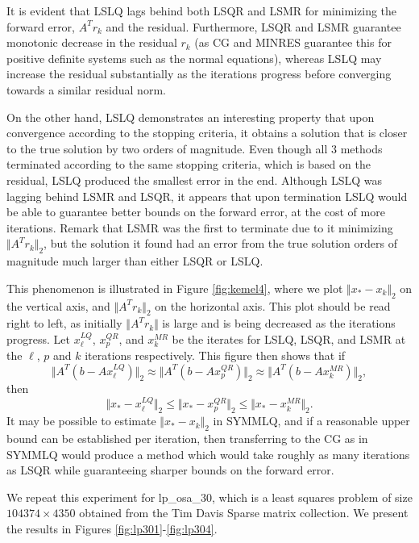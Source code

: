 \documentclass[11pt]{article}
\begin{document}
It is evident that LSLQ lags behind both LSQR and LSMR for minimizing the forward error, $A^T r_k$ and the residual. Furthermore, LSQR and LSMR guarantee monotonic decrease in the residual $r_k$ (as CG and MINRES guarantee this for positive definite systems such as the normal equations), whereas LSLQ may increase the residual substantially as the iterations progress before converging towards a similar residual norm.

On the other hand, LSLQ demonstrates an interesting property that upon convergence according to the stopping criteria, it obtains a solution that is closer to the true solution by two orders of magnitude. Even though all 3 methods terminated according to the same stopping criteria, which is based on the residual, LSLQ produced the smallest error in the end. Although LSLQ was lagging behind LSMR and LSQR, it appears that upon termination LSLQ would be able to guarantee better bounds on the forward error, at the cost of more iterations. Remark that LSMR was the first to terminate due to it minimizing $\Vert A^T r_k \Vert_2$, but the solution it found had an error from the true solution orders of magnitude much larger than either LSQR or LSLQ.

This phenomenon is illustrated in Figure \ref{fig:kemel4}, where we plot $\Vert x_* - x_k \Vert_2$ on the vertical axis, and $\Vert A^T r_k \Vert_2$ on the horizontal axis. This plot should be read right to left, as initially $\Vert A^T r_k \Vert$ is large and is being decreased as the iterations progress. Let $x^{LQ}_\ell$, $x^{QR}_p$, and $x^{MR}_k$ be the iterates for LSLQ, LSQR, and LSMR at the $\ell$, $p$ and $k$ iterations respectively. This figure then shows that if
$$ \Vert A^T (b - A x^{LQ}_\ell) \Vert_2 \approx \Vert A^T (b - A x^{QR}_p) \Vert_2 \approx \Vert A^T (b - A x^{MR}_k) \Vert_2,$$
then
$$ \Vert x_* - x^{LQ}_\ell \Vert_2 \leq \Vert x_* - x^{QR}_p \Vert_2 \leq \Vert x_* -  x^{MR}_k \Vert_2.$$
It may be possible to estimate $\Vert x_* - x_k \Vert_2$ in SYMMLQ, and if a reasonable upper bound can be established per iteration, then transferring to the CG as in SYMMLQ would produce a method which would take roughly as many iterations as LSQR while guaranteeing sharper bounds on the forward error.

We repeat this experiment for lp\_osa\_30, which is a least squares problem of size $104374 \times 4350$ obtained from the Tim Davis Sparse matrix collection. We present the results in Figures \ref{fig:lp301}-\ref{fig:lp304}.
\end{document}
